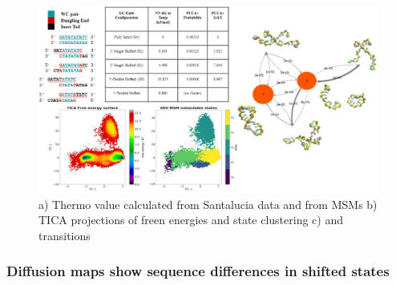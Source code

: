 \documentclass[journal=jpcbfk,manuscript=article]{achemso}
\begin{document}
\begin{figure}[ht!]
	\begin{center}
        \includegraphics[width=\textwidth]{Figs/figs_0804/GC-end_in_one.PNG}
        \caption{a) Thermo value calculated from Santalucia data and from MSMs b) TICA projections of freen energies and state clustering c) and transitions}
        \label{fig:GC-end_in_one}
	\end{center}
\end{figure}

\subsubsection{Diffusion maps show sequence differences in shifted states}
\end{document}
